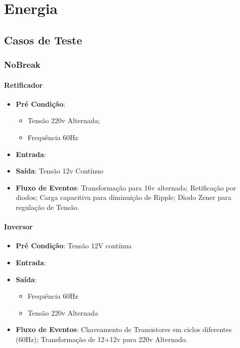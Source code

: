 \chapter[Energia]{Energia}
    \section[Casos de Teste]{Casos de Teste}
        \subsection[NoBreak]{NoBreak}
            \subsubsection[Retificador]{Retificador}
                \begin{itemize}
                    \item \textbf{Pré Condição}:
                        \begin{itemize}
                            \item Tensão 220v Alternada;
                            \item Frequência 60Hz
                        \end{itemize}
                    \item \textbf{Entrada}:
                    \item \textbf{Saída}: Tensão 12v Contínuo
                    \item \textbf{Fluxo de Eventos}: Transformação para 16v alternada; 
                        Retificação por diodos; Carga capacitiva para diminuição de
                        Ripple; Diodo Zener para regulação de Tensão.
                \end{itemize}

            \subsubsection[Inversor]{Inversor}
                \begin{itemize}
                    \item \textbf{Pré Condição}: Tensão 12V contínua
                    \item \textbf{Entrada}:
                    \item \textbf{Saída}: 
                        \begin{itemize}
                            \item Frequência 60Hz
                            \item Tensão 220v Alternada
                        \end{itemize}
                    \item \textbf{Fluxo de Eventos}: Chaveamento  de Transistores em ciclos 
                        diferentes (60Hz); Transformação de 12+12v para 220v Alternado.
                \end{itemize}
                            
